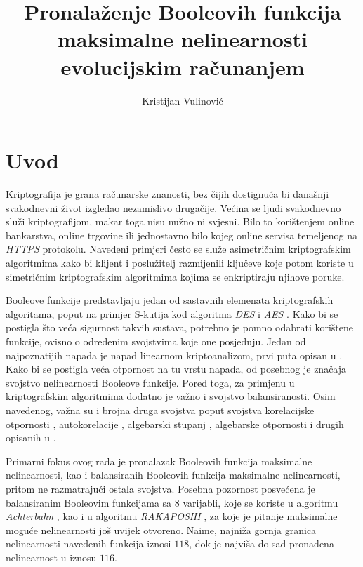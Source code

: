 \documentclass[times, utf8, diplomski, numeric]{fer}
\begin{document}

\title{Pronalaženje Booleovih funkcija maksimalne nelinearnosti evolucijskim računanjem}
\author{Kristijan Vulinović}

\maketitle

\izvornik

\zahvala{}

\tableofcontents

\chapter{Uvod}
Kriptografija je grana računarske znanosti, bez čijih dostignuća bi današnji svakodnevni život izgledao nezamislivo drugačije.
Većina se ljudi svakodnevno služi kriptografijom, makar toga nisu nužno ni svjesni.
Bilo to korištenjem online bankarstva, online trgovine ili jednostavno bilo kojeg online servisa temeljenog na \textit{HTTPS} protokolu.
Navedeni primjeri često se služe asimetričnim kriptografskim algoritmima kako bi klijent i poslužitelj razmijenili ključeve koje potom koriste u simetričnim kriptografskim algoritmima kojima se enkriptiraju njihove poruke.

Booleove funkcije predstavljaju jedan od sastavnih elemenata kriptografskih algoritama, poput na primjer S-kutija kod algoritma \textit{DES} i \textit{AES} \cite{daemen1999aes}.
Kako bi se postigla što veća sigurnost takvih sustava, potrebno je pomno odabrati korištene funkcije, ovisno o određenim svojstvima koje one posjeduju.
Jedan od najpoznatijih napada je napad linearnom kriptoanalizom, prvi puta opisan u \cite{golic1994linear}.
Kako bi se postigla veća otpornost na tu vrstu napada, od posebnog je značaja svojstvo nelinearnosti Booleove funkcije.
Pored toga, za primjenu u kriptografskim algoritmima dodatno je važno i svojstvo balansiranosti.
Osim navedenog, važna su i brojna druga svojstva poput svojstva korelacijske otpornosti , autokorelacije , algebarski stupanj , algebarske otpornosti  i drugih opisanih u \cite{CryptographicBooleanFunctions}.

Primarni fokus ovog rada je pronalazak Booleovih funkcija maksimalne nelinearnosti, kao i balansiranih Booleovih funkcija maksimalne nelinearnosti, pritom ne razmatrajući ostala svojstva.
Posebna pozornost posvećena je balansiranim Booleovim funkcijama sa $8$ varijabli, koje se koriste u algoritmu \textit{Achterbahn} \cite{gammel2005achterbahn}, kao i u algoritmu \textit{RAKAPOSHI} \cite{cid2009rakaposhi}, za koje je pitanje maksimalne moguće nelinearnosti još uvijek otvoreno.
Naime, najniža gornja granica nelinearnosti navedenih funkcija iznosi $118$, dok je najviša do sad pronađena nelinearnost u iznosu $116$.
\end{document}
